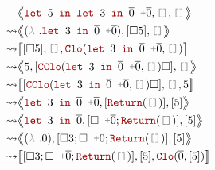\documentclass[english, references=cleveref]{programming}
\newcommand{\leval}{\left\langle\!\!\left\langle}
\newcommand{\reval}{\right\rangle\!\!\right\rangle}
\newcommand{\lcont}{\left[\!\!\left[}
\newcommand{\rcont}{\right]\!\!\right]}
\begin{document}
\begin{align}
           & {\leval { \synlet { \ghostvalue { \ghostint 5}} \synin {{ \synlet { \ghostvalue { \ghostint 3}} \synin { \overline{\synvar{ 0}} }} \synpunct{ +} { \overline{\synvar{ 0}} }}}, \synpunct{[]}, \synpunct{[]} \reval}                         \\
  \leadsto & {\leval { ( \synlambda. {{ \synlet { \ghostvalue { \ghostint 3}} \synin { \overline{\synvar{ 0}} }} \synpunct{ +} { \overline{\synvar{ 0}} }}) }, { [{ \square { \ghostvalue { \ghostint 5}}}] }, \synpunct{[]} \reval}                     \\
  \leadsto & {\lcont { [{ \square { \ghostvalue { \ghostint 5}}}] }, \synpunct{[]}, {{ \synClo( {{ \synlet { \ghostvalue { \ghostint 3}} \synin { \overline{\synvar{ 0}} }} \synpunct{ +} { \overline{\synvar{ 0}} }}, \synpunct{[]}) }} \rcont}         \\
  \leadsto & {\leval { \ghostvalue { \ghostint 5}}, { [{ \synCClo( {{ \synlet { \ghostvalue { \ghostint 3}} \synin { \overline{\synvar{ 0}} }} \synpunct{ +} { \overline{\synvar{ 0}} }}, \synpunct{[]}) \square }] }, \synpunct{[]} \reval}             \\
  \leadsto & {\lcont { [{ \synCClo( {{ \synlet { \ghostvalue { \ghostint 3}} \synin { \overline{\synvar{ 0}} }} \synpunct{ +} { \overline{\synvar{ 0}} }}, \synpunct{[]}) \square }] }, \synpunct{[]}, {{ \ghostint 5}} \rcont}                          \\
  \leadsto & {\leval {{ \synlet { \ghostvalue { \ghostint 3}} \synin { \overline{\synvar{ 0}} }} \synpunct{ +} { \overline{\synvar{ 0}} }}, { [{ \synReturn( \synpunct{[]}) }] }, { [{ \ghostint 5}] } \reval}                                           \\
  \leadsto & {\leval { \synlet { \ghostvalue { \ghostint 3}} \synin { \overline{\synvar{ 0}} }}, { [{ \square \synpunct{ +} { \overline{\synvar{ 0}} }}; { \synReturn( \synpunct{[]}) }] }, { [ { \ghostint 5}] } \reval}                                \\
  \leadsto & {\leval { ( \synlambda. { \overline{\synvar{ 0}} }) }, { [{ \square { \ghostvalue { \ghostint 3}}}; { \square \synpunct{ +} { \overline{\synvar{ 0}} }}; { \synReturn( \synpunct{[]}) }] }, { [ { \ghostint 5}] } \reval}                   \\
  \leadsto & {\lcont { [{ \square { \ghostvalue { \ghostint 3}}}; { \square \synpunct{ +} { \overline{\synvar{ 0}} }}; { \synReturn( \synpunct{[]}) }] }, { [{ \ghostint 5}] }, {{ \synClo( { \overline{\synvar{ 0}} }, { [{ \ghostint 5}] }) }} \rcont} \\

\end{align}
\end{document}
